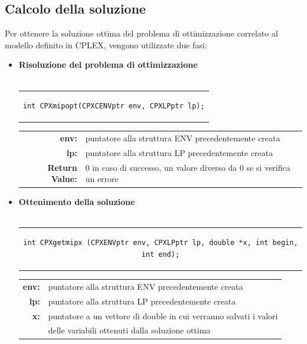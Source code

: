 \subsection{Calcolo della soluzione}
Per ottenere la soluzione ottima del problema di ottimizzazione correlato al modello definito in CPLEX, vengono utilizzate due fasi:
\begin{itemize}
\item{\textbf{Risoluzione del problema di ottimizzazione}\\\\
\begin{tabular}{c}
\begin{lstlisting}[linewidth=220pt, basicstyle=\footnotesize\sffamily,]
int CPXmipopt(CPXCENVptr env, CPXLPptr lp);
\end{lstlisting}
\end{tabular}
\begin{table}[h]
\centering
\begin{tabular}{rl}
\textbf{env:} & {puntatore alla struttura ENV precedentemente creata}\\
\textbf{lp:} & {puntatore alla struttura LP precedentemente creata}\\
\textbf{Return Value:} & {0 in caso di successo, un valore diverso da 0 se si verifica un errore}\\
\end{tabular}
\end{table}
}
\item{\textbf{Ottenimento della soluzione}\\\\
\begin{tabular}{c}
\begin{lstlisting}[linewidth=380pt, basicstyle=\footnotesize\sffamily,]
int CPXgetmipx (CPXENVptr env, CPXLPptr lp, double *x, int begin, int end);
\end{lstlisting}
\end{tabular}
\vspace{2 cm}
\begin{table}[h]
\centering
\begin{tabular}{rl}
\textbf{env:} & {puntatore alla struttura ENV precedentemente creata}\\
\textbf{lp:} & {puntatore alla struttura LP precedentemente creata}\\
\textbf{x:} & {puntatore a un vettore di double in cui verranno salvati i valori}\\
& {delle variabili ottenuti dalla soluzione ottima}\\

\end{tabular}
\end{table}}
\end{itemize}
